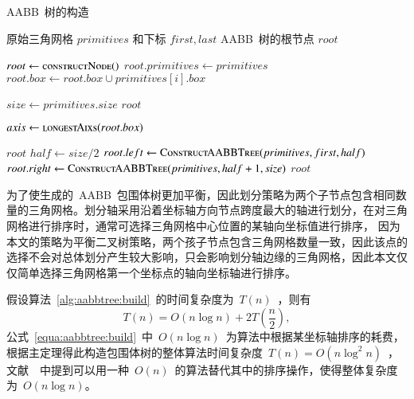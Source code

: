 \begin{algorithm}[htbp]
\small
\caption{AABB~树的构造}
\label{alg:aabbtree:build}
\begin{algorithmic}[1]
\Require
原始三角网格 $primitives$ 和下标 $first, last$
\Ensure
AABB~树的根节点 $root$

  \State $root \gets \Call{constructNode()}{}$ 
  \State $root.primitives \gets primitives$
      \State $root.box \gets root.box \cup primitives[i].box$
  \EndFor

  \State $size \gets primitives.size$  
  \State \Return $root$
  \EndIf

  \State $axis \gets \Call{longestAixs}{root.box}$
  
      \State \Return $root$
  \EndIf
  \State $half \gets size / 2 $
  \State $root.left \gets \Call{ConstructAABBTree}{primitives, first, half}$
  \State {}
  \State $root.right \gets \Call{ConstructAABBTree}{primitives, half+1, size}$ 
  \State \Return $root$
\EndFunction
\end{algorithmic}
\end{algorithm}

为了使生成的~AABB~包围体树更加平衡，因此划分策略为两个子节点包含相同数量的三角网格。划分轴采用沿着坐标轴方向节点跨度最大的轴进行划分，在对三角网格进行排序时，通常可选择三角网格中心位置的某轴向坐标值进行排序，
因为本文的策略为平衡二叉树策略，两个孩子节点包含三角网格数量一致，因此该点的选择不会对总体划分产生较大影响，只会影响划分轴边缘的三角网格，因此本文仅仅简单选择三角网格第一个坐标点的轴向坐标轴进行排序。

假设算法~\ref{alg:aabbtree:build}~的时间复杂度为~$T(n)$~，则有
\begin{equation}
  T(n) = O(n \log n ) + 2T(\frac{n}{2}),
\label{equa:aabbtree:build}
\end{equation}
公式~\ref{equa:aabbtree:build}~中~$O(n \log n)$~为算法中根据某坐标轴排序的耗费，根据主定理得此构造包围体树的整体算法时间复杂度~$T(n)=O(n\log^2n)$~，文献~~中提到可以用一种~$O(n)$~的算法替代其中的排序操作，使得整体复杂度为~$O(n\log n)$。

